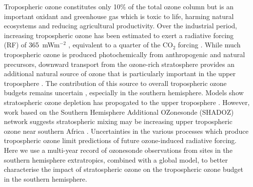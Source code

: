 \documentclass[acp, manuscript]{copernicus} %
\begin{document}
\introduction  %
%

  Tropospheric ozone constitutes only 10\% of the total ozone column but is an important oxidant and greenhouse gas which is toxic to life, harming natural ecosystems and reducing agricultural productivity.
  Over the industrial period, increasing tropospheric ozone has been estimated to exert a radiative forcing (RF) of 365~mWm$^{-2}$  \citep{Stevenson2013}, equivalent to a quarter of the CO$_2$ forcing \citep{IPCC_Chapter2}. 
  While much tropospheric ozone is produced photochemically from anthropogenic and natural precursors, %
  downward transport from the ozone-rich stratosphere provides an additional natural source of ozone that is particularly important in the upper troposphere \citep[][and references therein]{Jacobson2000}.
  The contribution of this source to overall tropospheric ozone budgets remains uncertain \citep{Skerlak2014}, especially in the southern hemisphere.
  Models show stratospheric ozone depletion has propogated to the upper troposphere \citep{Stevenson2013}. 
  However, work based on the Southern Hemisphere Additional OZonesonde (SHADOZ) network suggests stratospheric mixing may be increasing upper tropospheric ozone near southern Africa \citep{Liu2015, Thompson2014}.
  Uncertainties in the various processes which produce tropospheric ozone limit predictions of future ozone-induced radiative forcing.
  Here we use a multi-year record of ozonesonde observations from sites in the southern hemisphere extratropics, combined with a global model, to better characterise the impact of stratospheric ozone on the tropospheric ozone budget in the southern hemisphere.
\end{document}
